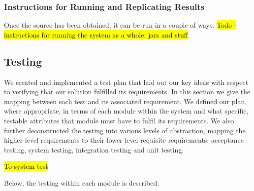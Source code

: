 \documentclass[10pt,a4paper]{article}
\begin{document}
\subsubsection{Instructions for Running and Replicating Results}
Once the source has been obtained, it can be run in a couple of ways. \hl{Todo - instructions for running the system as a whole: jars and stuff}

\subsection{Testing} 
We created and implemented a test plan that laid out our key ideas
with respect to verifying that our solution fulfilled its
requirements. In this section we give the mapping between each
test and its associated requirement. We
defined our plan, where appropriate, in terms of each module within
the system and what specific, testable attributes that module must
have to fulfil its requirements. We also further deconstructed the
testing into various levels of abstraction, mapping the higher level
requirements to their lower level requisite requirements: acceptance
testing, system testing, integration testing and unit
testing.


\hl{To system test}

Below, the testing within each module is described:
\end{document}
